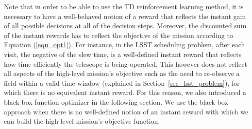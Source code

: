\documentclass[12pt]{aastex62}
\theoremstyle{definition}
\begin{document}
Note that in order to be able to use the TD reinforcement learning method, it is necessary to have a well-behaved notion of a reward that reflects the instant gain of all possible decisions at all of the decision steps. Moreover, the discounted sum of the instant rewards has to reflect the objective of the mission according to Equation (\ref{equ_opt1}). For instance, in the LSST scheduling problem, after each visit, the negative of the slew time, is a well-defined instant reward that reflects how time-efficiently the telescope is being operated. This however does not reflect all aspects of the high-level mission's objective such as the need to re-observe a field within a valid time window (explained in Section~\ref{sec_lsst_problem}), for which there is no equivalent instant reward. For this reason, we also introduced a black-box function optimizer in the following section. We use the black-box approach when there is no well-defined notion of an instant reward with which we can build the high-level mission's objective function.
\end{document}
